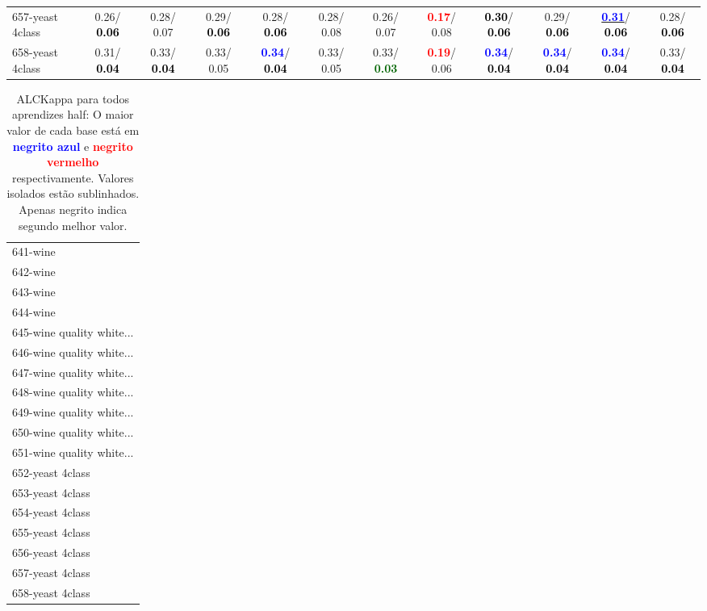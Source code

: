 \begin{table}[h]
\begin{center}
{\begin{tabular}{lc|c|c|c|c|c|c|c|c|c|c}
657-yeast 4class &   0.26/\textcolor{black}{\textbf{  0.06}} &   0.28/  0.07 &   0.29/\textcolor{black}{\textbf{  0.06}} &   0.28/\textcolor{black}{\textbf{  0.06}} &   0.28/  0.08 &   0.26/  0.07 & \textcolor{red}{\textbf{  0.17}}/  0.08 & \textcolor{black}{\textbf{  0.30}}/\textcolor{black}{\textbf{  0.06}} &   0.29/\textcolor{black}{\textbf{  0.06}} & \underline{\textcolor{blue}{\textbf{  0.31}}}/\textcolor{black}{\textbf{  0.06}} &   0.28/\textcolor{black}{\textbf{  0.06}} \\
658-yeast 4class &   0.31/\textcolor{black}{\textbf{  0.04}} &   0.33/\textcolor{black}{\textbf{  0.04}} &   0.33/  0.05 & \textcolor{blue}{\textbf{  0.34}}/\textcolor{black}{\textbf{  0.04}} &   0.33/  0.05 &   0.33/\textcolor{darkgreen}{\textbf{  0.03}} & \textcolor{red}{\textbf{  0.19}}/  0.06 & \textcolor{blue}{\textbf{  0.34}}/\textcolor{black}{\textbf{  0.04}} & \textcolor{blue}{\textbf{  0.34}}/\textcolor{black}{\textbf{  0.04}} & \textcolor{blue}{\textbf{  0.34}}/\textcolor{black}{\textbf{  0.04}} &   0.33/\textcolor{black}{\textbf{  0.04}} \\\end{tabular}}\label{stratsALCKappa20AllReduxHalfa}
\end{center}
\end{table}
\begin{table}[h]
\caption{ALCKappa para todos aprendizes half: O maior valor de cada base está em \textcolor{blue}{\textbf{negrito azul}} e \textcolor{red}{\textbf{negrito vermelho}} respectivamente. Valores isolados estão sublinhados. Apenas negrito indica segundo melhor valor.}
\begin{center}\begin{tabular}{l}
 & \\ \hline 641-wine &  \\
642-wine &  \\
643-wine &  \\
644-wine &  \\
645-wine quality white... &  \\
646-wine quality white... &  \\
647-wine quality white... &  \\ \hline
648-wine quality white... &  \\
649-wine quality white... &  \\
650-wine quality white... &  \\
651-wine quality white... &  \\
652-yeast 4class &  \\
653-yeast 4class &  \\
654-yeast 4class &  \\ \hline
655-yeast 4class &  \\
656-yeast 4class &  \\
657-yeast 4class &  \\
658-yeast 4class &  \\\end{tabular}\label{stratsALCKappa20AllReduxHalfb}
\end{center}
\end{table}